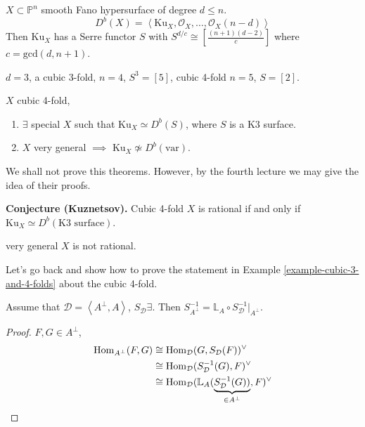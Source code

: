 \begin{theorem}[Kuznetsov]
\label{theorem-Kuznetsov}
$X \subset \mathbb{P}^n$ smooth Fano
hypersurface of degree $d \leq n$.
$$
D^b(X)=\left\langle{}\text{Ku}_X,\mathcal{O}_X,
\ldots,
\mathcal{O}_X(n-d)\right\rangle{}
$$
Then $\text{Ku}_X$ has a Serre functor $S$
with
$S^{d/c}\cong\left[\frac{(n+1)(d-2)}{c}
\right]
$
where $c=\text{gcd}(d,n+1)$.
\end{theorem}

\begin{example}
\label{example-cubic-3-and-4-folds}
$d=3$, a cubic 3-fold,  $n=4$,  $S^3=[5]$,
cubic 4-fold $n=5$,  $S=[2]$.
\end{example}

\begin{theorem}[Kuznetsov]
\label{theorem-Kuznetsov-2}
$X$ cubic 4-fold,
\begin{enumerate}
\item $\exists $ special $X$ such that
$\text{Ku}_X \simeq D^b(S)$, where $S$ is
a K3 surface.
\item $X$ very general $\implies$
$\text{Ku}_X \not \simeq D^b(\text{var})$.
\end{enumerate}
\end{theorem}

We shall not prove this theorems. However, by
the fourth lecture we may give the idea of
their proofs.

\medskip\noindent
{\bf Conjecture (Kuznetsov).} Cubic 4-fold
$X$ is rational if and only if $\text{Ku}_X
\simeq D^b(\text{K3 surface})$.

\medskip\noindent
[KKPY] very general $X$ is not rational.

\medskip\noindent
Let's go back and show how to prove the
statement in Example
\ref{example-cubic-3-and-4-folds} about
the cubic 4-fold.

\begin{lemma}
\label{lemma-cubic-4-fold}
Assume that
$\mathcal{D}=\left\langle{}A^{\perp},A\right\rangle{}$,
$S_{\mathcal{D}}\exists $. Then
$S^{-1}_{A^\perp}=\mathbb{L}_A\circ
S^{-1}_{\mathcal{D}}|_{A^\perp}$.
\end{lemma}

\begin{proof}
$F,G \in A^\perp$,
$$
\begin{aligned}
\mathop{\mathrm{Hom}}\nolimits_{A^\perp}(F,G)
&\cong\mathop{\mathrm{Hom}}\nolimits_{\mathcal{D}}(G,S_{\mathcal{D}}(F)
)
^\vee\\
&\cong\mathop{\mathrm{Hom}}\nolimits_{\mathcal{D}}(S^{-1}_{\mathcal{D}}
(G),F)^\vee\\
&\cong
\mathop{\mathrm{Hom}}\nolimits_{\mathcal{D}}(\mathbb{L}
_A(\underbrace{S^{-1}_{\mathcal{D}}(G))}
_{\in A^\perp},F)^\vee
\end{aligned}
$$
\end{proof}

